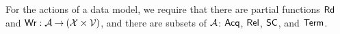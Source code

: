 For the actions of a data model, we require that
there are partial functions $\mathsf{Rd}$ and
$\mathsf{Wr}: \mathcal{A} \mathbin\rightarrow (\mathcal{X} \times \mathcal{V})$, and there are subsets of $\mathcal{A}$:
$\mathsf{Acq}$, $\mathsf{Rel}$, $\mathsf{SC}$, and $\mathsf{Term}$.

